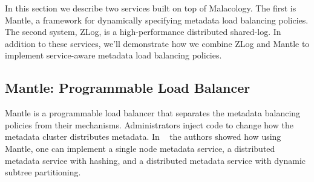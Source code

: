 \documentclass[preprint]{sigplanconf-eurosys}
\begin{document}
\label{services}

In this section we describe two services built on top of Malacology. The first
is Mantle, a framework for dynamically specifying metadata load balancing
policies. The second system, ZLog, is a high-performance distributed shared-log.
In addition to these services, we'll demonstrate how we combine ZLog and Mantle
to implement service-aware metadata load balancing policies.

\subsection{Mantle: Programmable Load Balancer}
\label{sec:mantle}

Mantle is a programmable load balancer that separates the metadata balancing
policies from their mechanisms. Administrators inject code to change how the
metadata cluster distributes metadata. In ~\cite{sevilla:sc15-mantle} the
authors showed how using Mantle, one can implement a single node metadata
service, a distributed metadata service with hashing, and a distributed
metadata service with dynamic subtree partitioning. 
\end{document}

